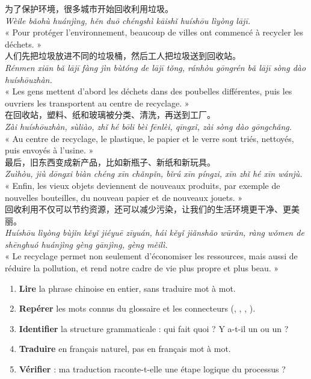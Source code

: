 \documentclass[11pt]{article}
\newcommand{\zh}[1]{\ifmmode\text{#1}\else{#1}\fi}
\begin{document}
\begin{textebox}
为了保护环境，很多城市开始回收利用垃圾。\\
\emph{Wèile bǎohù huánjìng, hěn duō chéngshì kāishǐ huíshōu lìyòng lājī.}\\
« Pour protéger l'environnement, beaucoup de villes ont commencé à recycler les déchets. »\\[0.4em]
人们先把垃圾放进不同的垃圾桶，然后工人把垃圾送到回收站。\\
\emph{Rénmen xiān bǎ lājī fàng jìn bùtóng de lājī tǒng, ránhòu gōngrén bǎ lājī sòng dào huíshōuzhàn.}\\
« Les gens mettent d'abord les déchets dans des poubelles différentes, puis les ouvriers les transportent au centre de recyclage. »\\[0.4em]
在回收站，塑料、纸和玻璃被分类、清洗，再送到工厂。\\
\emph{Zài huíshōuzhàn, sùliào, zhǐ hé bōli bèi fēnlèi, qīngxǐ, zài sòng dào gōngchǎng.}\\
« Au centre de recyclage, le plastique, le papier et le verre sont triés, nettoyés, puis envoyés à l'usine. »\\[0.4em]
最后，旧东西变成新产品，比如新瓶子、新纸和新玩具。\\
\emph{Zuìhòu, jiù dōngxi biàn chéng xīn chǎnpǐn, bǐrú xīn píngzi, xīn zhǐ hé xīn wánjù.}\\
« Enfin, les vieux objets deviennent de nouveaux produits, par exemple de nouvelles bouteilles, du nouveau papier et de nouveaux jouets. »\\[0.4em]
回收利用不仅可以节约资源，还可以减少污染，让我们的生活环境更干净、更美丽。\\
\emph{Huíshōu lìyòng bùjǐn kěyǐ jiéyuē zīyuán, hái kěyǐ jiǎnshǎo wūrǎn, ràng wǒmen de shēnghuó huánjìng gèng gānjìng, gèng měilì.}\\
« Le recyclage permet non seulement d'économiser les ressources, mais aussi de réduire la pollution, et rend notre cadre de vie plus propre et plus beau. »
\end{textebox}

\begin{methode}
\begin{enumerate}
\item \textbf{Lire} la phrase chinoise en entier, sans traduire mot à mot.
\item \textbf{Repérer} les mots connus du glossaire et les connecteurs (\zh{先}, \zh{然后}, \zh{再}, \zh{最后}).
\item \textbf{Identifier} la structure grammaticale : qui fait quoi ? Y a-t-il un \zh{把} ou un \zh{被} ?
\item \textbf{Traduire} en français naturel, pas en français mot à mot.
\item \textbf{Vérifier} : ma traduction raconte-t-elle une étape logique du processus ?
\end{enumerate}
\end{methode}
\end{document}
